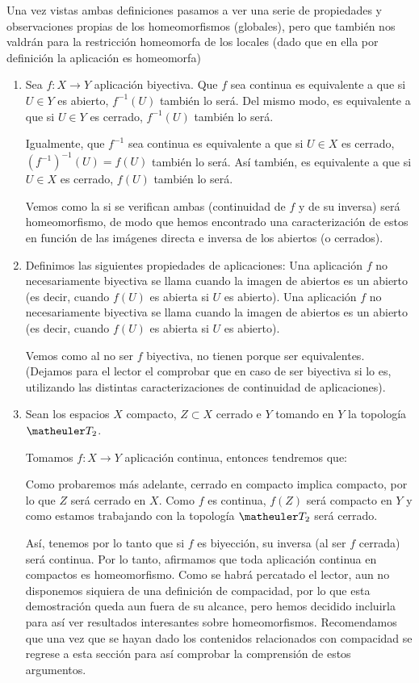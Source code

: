 Una vez vistas ambas definiciones pasamos a ver una serie de propiedades y observaciones propias de los homeomorfismos (globales), pero que también nos valdrán para la restricción homeomorfa de los locales (dado que en ella por definición la aplicación es homeomorfa)
\label{etop_obs_homeomorfismo}
\begin{obs}
	\begin{enumerate}
		\item 
		Sea $f:X\rightarrow Y$ aplicación biyectiva.
		Que $f$ sea continua es equivalente a que si $U\in Y$ es abierto, $f^{-1}(U)$ también lo será. Del mismo modo, es equivalente a que si $U\in Y$ es cerrado, $f^{-1}(U)$ también lo será.
		
		Igualmente, que $f^{-1}$ sea continua es equivalente a que si $U\in X$ es cerrado, $(f^{-1})^{-1}(U)=f(U)$ también lo será. Así también, es equivalente a que si $U\in X$ es cerrado, $f(U)$ también lo será.
		
		Vemos como la si se verifican ambas (continuidad de $f$ y de su inversa) será homeomorfismo, de modo que hemos encontrado una caracterización de estos en función de las imágenes directa e inversa de los abiertos (o cerrados).
		
		\item
		Definimos las siguientes propiedades de aplicaciones:
		Una aplicación $f$ no necesariamente biyectiva se llama  cuando la imagen de abiertos es un abierto (es decir, cuando $f(U)$ es abierta si $U$ es abierto).
		Una aplicación $f$ no necesariamente biyectiva se llama  cuando la imagen de abiertos es un abierto (es decir, cuando $f(U)$ es abierta si $U$ es abierto).
		
		Vemos como al no ser $f$ biyectiva, no tienen porque ser equivalentes. (Dejamos para el lector el comprobar que en caso de ser biyectiva si lo es, utilizando las distintas caracterizaciones de continuidad de aplicaciones).
		
		\item
		Sean los espacios $X$ compacto, $Z\subset X$ cerrado e $Y$ tomando en $Y$ la topología $\T_2$.
	
		 Tomamos $f: X\rightarrow Y$ aplicación continua, entonces tendremos que:
		
		Como probaremos más adelante, cerrado en compacto implica compacto, por lo que $Z$ será cerrado en $X$.
		Como $f$ es continua, $f(Z)$ será compacto en $Y$ y como estamos trabajando con la topología $\T_2$ será cerrado.
		
		Así, tenemos por lo tanto que si $f$ es biyección, su inversa (al ser $f$ cerrada) será continua. Por lo tanto, afirmamos que toda aplicación continua en compactos es homeomorfismo.
		Como se habrá percatado el lector, aun no disponemos siquiera de una definición de compacidad, por lo que esta demostración queda aun fuera de su alcance, pero hemos decidido incluirla para así ver resultados interesantes sobre homeomorfismos. Recomendamos que una vez que se hayan dado los contenidos relacionados con compacidad se regrese a esta sección para así comprobar la comprensión de estos argumentos.
	\end{enumerate}
\end{obs}
